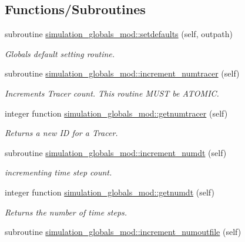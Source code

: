 \subsection*{Functions/\+Subroutines}
\begin{DoxyCompactItemize}
\item 
subroutine \mbox{\hyperlink{namespacesimulation__globals__mod_a11bedd9242e49b12d9e305d45ef9ea00}{simulation\+\_\+globals\+\_\+mod\+::setdefaults}} (self, outpath)
\begin{DoxyCompactList}\small\item\em Globals default setting routine. \end{DoxyCompactList}\item 
subroutine \mbox{\hyperlink{namespacesimulation__globals__mod_ae9910caa377f4d2875e59c749ee0488c}{simulation\+\_\+globals\+\_\+mod\+::increment\+\_\+numtracer}} (self)
\begin{DoxyCompactList}\small\item\em Increments Tracer count. This routine M\+U\+ST be A\+T\+O\+M\+IC. \end{DoxyCompactList}\item 
integer function \mbox{\hyperlink{namespacesimulation__globals__mod_a8314536e15b0e28f0072da22d2a2ecbf}{simulation\+\_\+globals\+\_\+mod\+::getnumtracer}} (self)
\begin{DoxyCompactList}\small\item\em Returns a new ID for a Tracer. \end{DoxyCompactList}\item 
subroutine \mbox{\hyperlink{namespacesimulation__globals__mod_a4e649e57b574f384eeca405a4c3c10b0}{simulation\+\_\+globals\+\_\+mod\+::increment\+\_\+numdt}} (self)
\begin{DoxyCompactList}\small\item\em incrementing time step count. \end{DoxyCompactList}\item 
integer function \mbox{\hyperlink{namespacesimulation__globals__mod_a7caca00d4eeb93c4120f0a8b27dda478}{simulation\+\_\+globals\+\_\+mod\+::getnumdt}} (self)
\begin{DoxyCompactList}\small\item\em Returns the number of time steps. \end{DoxyCompactList}\item 
subroutine \mbox{\hyperlink{namespacesimulation__globals__mod_a3f685028fd342cb9525599e00f04c7a6}{simulation\+\_\+globals\+\_\+mod\+::increment\+\_\+numoutfile}} (self)

\end{DoxyCompactItemize}
